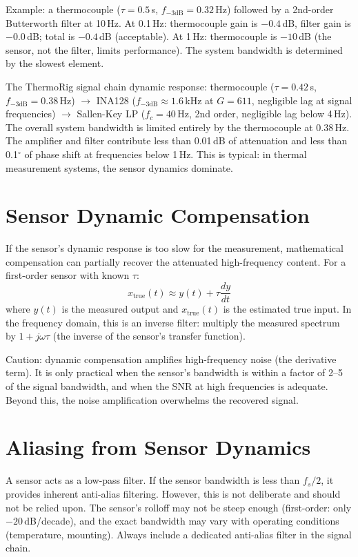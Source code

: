 \documentclass[11pt,letterpaper,twoside,openany]{book}
\begin{document}
Example: a thermocouple ($\tau = 0.5$\,s, $f_{-3\text{dB}} = 0.32$\,Hz) followed by a 2nd-order Butterworth filter at 10\,Hz. At 0.1\,Hz: thermocouple gain is $-0.4$\,dB, filter gain is $-0.0$\,dB; total is $-0.4$\,dB (acceptable). At 1\,Hz: thermocouple is $-10$\,dB (the sensor, not the filter, limits performance). The system bandwidth is determined by the slowest element.

\begin{examplebox}
The ThermoRig signal chain dynamic response: thermocouple ($\tau = 0.42$\,s, $f_{-3\text{dB}} = 0.38$\,Hz) $\to$ INA128 ($f_{-3\text{dB}} \approx 1.6$\,kHz at $G = 611$, negligible lag at signal frequencies) $\to$ Sallen-Key LP ($f_c = 40$\,Hz, 2nd order, negligible lag below 4\,Hz). The overall system bandwidth is limited entirely by the thermocouple at 0.38\,Hz. The amplifier and filter contribute less than 0.01\,dB of attenuation and less than 0.1$^\circ$ of phase shift at frequencies below 1\,Hz. This is typical: in thermal measurement systems, the sensor dynamics dominate.
\end{examplebox}

\section{Sensor Dynamic Compensation}
If the sensor's dynamic response is too slow for the measurement, mathematical compensation can partially recover the attenuated high-frequency content. For a first-order sensor with known $\tau$:
\begin{equation}
x_{\text{true}}(t) \approx y(t) + \tau \frac{dy}{dt}
\end{equation}
where $y(t)$ is the measured output and $x_{\text{true}}(t)$ is the estimated true input. In the frequency domain, this is an inverse filter: multiply the measured spectrum by $1 + j\omega\tau$ (the inverse of the sensor's transfer function).

Caution: dynamic compensation amplifies high-frequency noise (the derivative term). It is only practical when the sensor's bandwidth is within a factor of 2--5 of the signal bandwidth, and when the SNR at high frequencies is adequate. Beyond this, the noise amplification overwhelms the recovered signal.

\section{Aliasing from Sensor Dynamics}
A sensor acts as a low-pass filter. If the sensor bandwidth is less than $f_s/2$, it provides inherent anti-alias filtering. However, this is not deliberate and should not be relied upon. The sensor's rolloff may not be steep enough (first-order: only $-20$\,dB/decade), and the exact bandwidth may vary with operating conditions (temperature, mounting). Always include a dedicated anti-alias filter in the signal chain.
\end{document}
